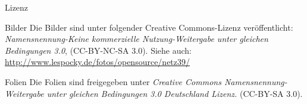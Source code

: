 \documentclass[hyperref={pdfpagelabels=false}]{beamer}
\begin{document}
\begin{frame}{Lizenz}
    \begin{block}{Bilder}
        Die Bilder sind unter folgender Creative Commons-Lizenz
        veröffentlicht: \emph{Namensnennung-Keine kommerzielle
        Nutzung-Weitergabe unter gleichen Bedingungen 3.0}, (CC-BY-NC-SA
        3.0). Siehe auch:
        \url{http://www.lespocky.de/fotos/opensource/netz39/}
    \end{block}
    \begin{block}{Folien}
        Die Folien sind freigegeben unter \emph{Creative Commons
        Namensnennung-Weitergabe unter gleichen Bedingungen 3.0 Deutschland
        Lizenz.} (CC-BY-SA 3.0).
    \end{block}
\end{frame}
\end{document}
